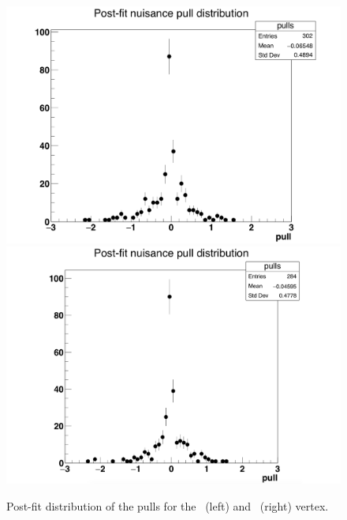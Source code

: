 \begin{figure}
	\centering
	\includegraphics[width=.49\linewidth]{6_Search/Figures/impact/pullsZutwithMC.pdf}
	\includegraphics[width=.49\linewidth]{6_Search/Figures/impact/pullsZctwithMC.pdf}
	\caption{Post-fit distribution of the pulls for the \Zut\ (left) and \Zct\ (right) vertex.}
	\label{fig:171102zctmle}
\end{figure}


